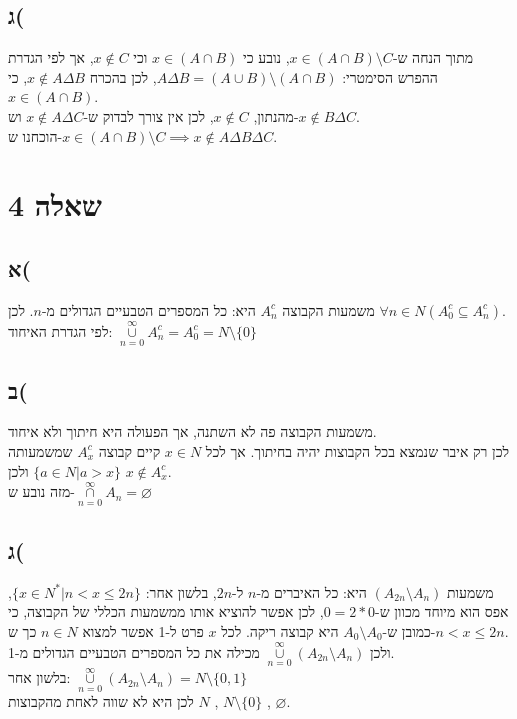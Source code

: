 \documentclass{article}
\begin{document}
\subsection*{ג(}

מתוך הנחה ש-$x \in (A \cap  B) \setminus C$, נובע כי $x \in (A \cap B) $ וכי $x \not\in C $, אך לפי הגדרת ההפרש הסימטרי: $A \Delta B = (A \cup  B) \setminus  (A \cap  B)$, לכן בהכרח $x \notin A \Delta B$, כי $x \in (A \cap B)$.  \\
מהנתון, $x \not\in C $, לכן אין צורך לבדוק ש-$x \not\in A \Delta C$ וש-$x \not\in B \Delta C$.\\
הוכחנו ש-$x \in (A \cap  B) \setminus C \implies x \not\in A \Delta B \Delta C$.

\section*{שאלה 4}
\subsection*{א(}
משמעות הקבוצה  $A_n^{c}$ היא: כל המספרים הטבעיים הגדולים מ-$n$. לכן $\forall n \in N (A_0^{c} \subseteq A_n^{c})$.\\
לפי הגדרת האיחוד: $\underset{n=0}{\overset{\infty}{\cup }} A_n^{c} = A_0^{c} = N \setminus \{0\}$
  
\subsection*{ב(}

משמעות הקבוצה פה לא השתנה, אך הפעולה היא חיתוך ולא איחוד.\\
לכן רק איבר שנמצא בכל הקבוצות יהיה בחיתוך. אך לכל $x \in N$ קיים קבוצה  $A_x^{c}$ שמשמעותה $\{a \in N | a > x \}$ ולכן $x \not\in A_x^{c}$.\\
מזה נובע ש-$ \underset{n=0}{\overset{\infty}{\cap }} A_n = \varnothing$


\subsection*{ג(}
משמעות $(A_{2n} \setminus A_n)$ היא: כל האיברים מ-$n$ ל-$2n$, בלשון אחר: $\{x \in  N^{*} | n < x \le 2n \}$, 
אפס הוא מיוחד מכוון ש-$0 = 2*0$, לכן אפשר להוציא אותו ממשמעות הכללי של הקבוצה,
כי כמובן ש-$A_0 \setminus  A_0$ היא קבוצה ריקה. לכל $x$ פרט ל-1 אפשר למצוא $n \in N$ 
כך ש-$n < x \le 2n$.\\
ולכן $\underset{n=0}{\overset{\infty}{\cup }} (A_{2n} \setminus  A_n)$ מכילה את כל
המספרים הטבעיים הגדולים מ-1.\\
בלשון אחר: $\underset{n=0}{\overset{\infty}{\cup }} (A_{2n} \setminus  A_n) = N \setminus \{0,1\}$\\
לכן היא לא שווה לאחת מהקבוצות $N$ ,  $N \setminus \{0\}$ , $ \varnothing $.
\end{document}
